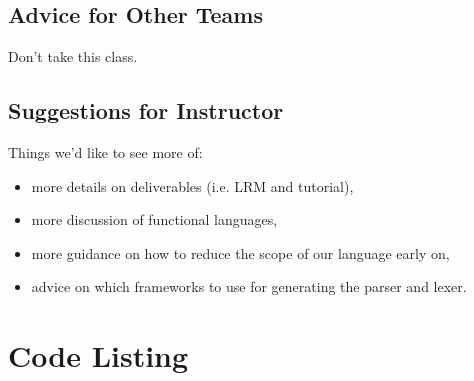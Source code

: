 \documentclass{report}
\begin{document}
\section{Advice for Other Teams}

Don't take this class.

\section{Suggestions for Instructor}

Things we'd like to see more of:

\begin{itemize}
\item more details on deliverables (i.e. LRM and tutorial), 
\item more discussion of functional languages,
\item more guidance on how to reduce the scope of our language early on,
\item advice on which frameworks to use for generating the parser and lexer. 
\end{itemize}

\appendix

\chapter{Code Listing}
\end{document}
